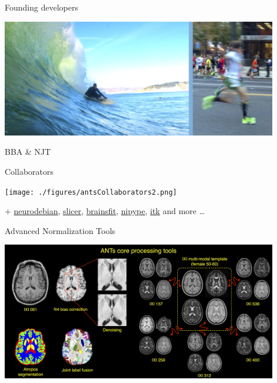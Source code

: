 \documentclass[ignorenonframetext,]{beamer}
\begin{document}
\begin{frame}{Founding developers}

\begin{center}
\includegraphics[width=4.75in]{./figures/brian_and_nick.png}
\end{center}

\begin{center}
BBA \& NJT
\end{center}

\end{frame}

\begin{frame}{Collaborators}

\begin{center}

\texttt{[image: ./figures/antsCollaborators2.png]}

\end{center}

\(+\) \href{http://neuro.debian.net/pkgs/ants.html}{neurodebian},
\href{http://www.slicer.org/}{slicer},
\href{https://github.com/BRAINSia/BRAINSTools}{brainsfit},
\href{http://nipy.sourceforge.net/nipype/}{nipype},
\href{http://www.itk.org}{itk} and more \ldots{}

\end{frame}

\begin{frame}{Advanced Normalization Tools}

\begin{center}

\includegraphics[width=4.75in]{./tools/figures/coreANtsToolsNeuro.png}

\end{center}

\end{frame}
\end{document}

